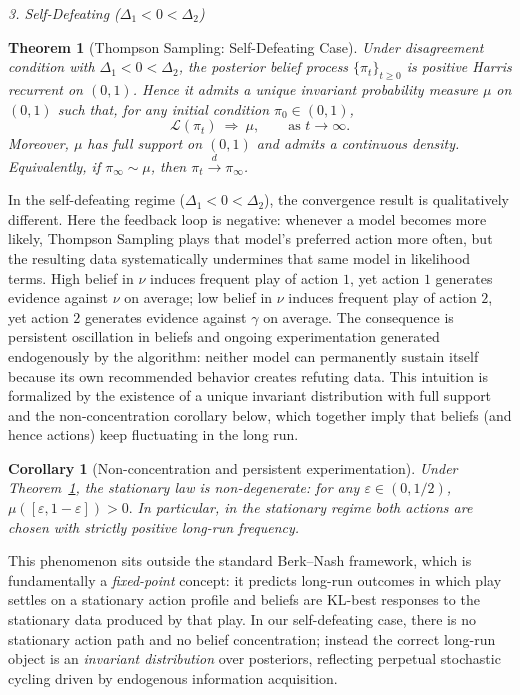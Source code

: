 \documentclass[12pt]{article}
\newtheorem{theorem}{Theorem}
\newtheorem{corollary}{Corollary}
\begin{document}
\vspace{1em}
\noindent\textit{3. Self-Defeating ($\Delta_1 < 0 < \Delta_2$)}

\begin{theorem}[Thompson Sampling: Self-Defeating Case]
\label{thm:self_defeating}
Under disagreement condition with $\Delta_1<0<\Delta_2$, the posterior belief process
$\{\pi_t\}_{t\ge 0}$ is positive Harris recurrent on $(0,1)$.
Hence it admits a unique invariant probability measure $\mu$ on $(0,1)$
such that, for any initial condition $\pi_0\in(0,1)$,
\[
\mathcal{L}(\pi_t)\ \Longrightarrow\ \mu,
\qquad\text{as } t\to\infty.
\]
Moreover, $\mu$ has full support on $(0,1)$ and admits a continuous density.
Equivalently, if $\pi_\infty\sim\mu$, then $\pi_t \xrightarrow{d} \pi_\infty$.
\end{theorem}


In the self-defeating regime ($\Delta_1<0<\Delta_2$), the convergence result is qualitatively different. Here the feedback loop is negative: whenever a model becomes more likely, Thompson Sampling plays that model's preferred action more often, but the resulting data systematically undermines that same model in likelihood terms. High belief in $\nu$ induces frequent play of action $1$, yet action $1$ generates evidence against $\nu$ on average; low belief in $\nu$ induces frequent play of action $2$, yet action $2$ generates evidence against $\gamma$ on average. The consequence is persistent oscillation in beliefs and ongoing experimentation generated endogenously by the algorithm: neither model can permanently sustain itself because its own recommended behavior creates refuting data. This intuition is formalized by the existence of a unique invariant distribution with full support and the non-concentration corollary below, which together imply that beliefs (and hence actions) keep fluctuating in the long run.

\begin{corollary}[Non-concentration and persistent experimentation]
Under Theorem~\ref{thm:self_defeating}, the stationary law is non-degenerate:
for any $\varepsilon\in(0,1/2)$, $\mu([\varepsilon,1-\varepsilon])>0.$
In particular, in the stationary regime both actions are chosen with strictly
positive long-run frequency.
\end{corollary}

This phenomenon sits outside the standard Berk--Nash framework, which is fundamentally a \emph{fixed-point} concept: it predicts long-run outcomes in which play settles on a stationary action profile and beliefs are KL-best responses to the stationary data produced by that play. In our self-defeating case, there is no stationary action path and no belief concentration; instead the correct long-run object is an \emph{invariant distribution} over posteriors, reflecting perpetual stochastic cycling driven by endogenous information acquisition. 
\end{document}
